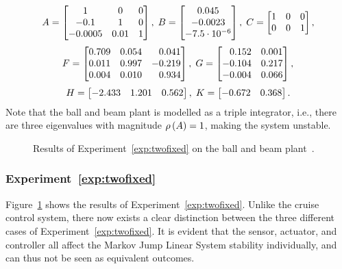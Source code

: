 \begin{equation*}
    A = \begin{bmatrix}
        1 & 0 & 0 \\
        -0.1 & 1 & 0 \\
        -0.0005 & 0.01 & 1
    \end{bmatrix}, \; B = \begin{bmatrix}
        0.045 \\
        -0.0023 \\
        -7.5\cdot 10^{-6}
    \end{bmatrix}, \;
    C = \begin{bmatrix}
        1 & 0 & 0 \\
        0 & 0 & 1
    \end{bmatrix},
\end{equation*}
\begin{equation*}
    F = \begin{bmatrix}
        0.709  & 0.054 &  \phantom{+}0.041 \\
        0.011  & 0.997 & -0.219 \\
        0.004  & 0.010 &  \phantom{+}0.934
    \end{bmatrix}, \; G = \begin{bmatrix}
        \phantom{+}0.152  & 0.001 \\
        -0.104 & 0.217 \\
        -0.004 & 0.066 \\
    \end{bmatrix},
\end{equation*}
\begin{equation*}
    H = \begin{bmatrix}
        -2.433 & 1.201 & 0.562
    \end{bmatrix}, \; K = \begin{bmatrix}
        -0.672 & 0.368
    \end{bmatrix}.
\end{equation*}
%
Note that the ball and beam plant is modelled as a triple integrator, i.e., there are three eigenvalues with magnitude $\rho\left( A \right) = 1$, making the system unstable.

\begin{figure}[t]
    \centering
    \caption{Results of Experiment~\ref{exp:twofixed} on the ball and beam plant~\cite{Vreman:2022}.}
    \label{fig:nils-fix2}
\end{figure}

\subsubsection*{Experiment~\ref{exp:twofixed}}%
%
Figure~\ref{fig:nils-fix2} shows the results of Experiment~\ref{exp:twofixed}.
Unlike the cruise control system, there now exists a clear distinction between the three different cases of Experiment~\ref{exp:twofixed}.
It is evident that the sensor, actuator, and controller all affect the Markov Jump Linear System stability individually, and can thus not be seen as equivalent outcomes.

